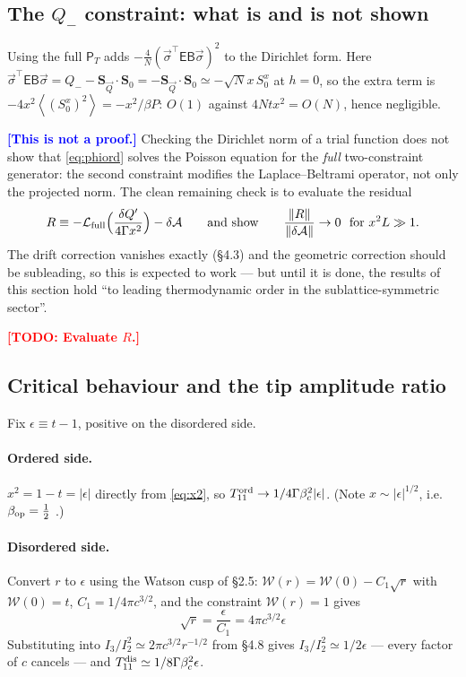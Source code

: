 \documentclass[11pt,a4paper]{article}
\newcommand{\bQ}{\vec Q}
\newcommand{\avg}[1]{\left\langle #1 \right\rangle}
\newcommand{\Wc}{\mathcal{W}}
\newcommand{\TODO}[1]{\textcolor{red}{\textbf{[TODO: #1]}}}
\newcommand{\FLAG}[1]{\textcolor{blue}{\textbf{[#1]}}}
\newcommand{\Ac}{\mathcal{A}}
\newcommand{\Lc}{\mathcal{L}}
\newcommand{\Em}{\mathsf{E}}
\newcommand{\Pt}{\mathsf{P}_{T}}
\newcommand{\Tm}{T}
\newcommand{\bQ}{\vec Q}
\newcommand{\bs}{\vec\sigma}
\newcommand{\avg}[1]{\left\langle #1 \right\rangle}
\newcommand{\Wc}{\mathcal{W}}
\newcommand{\TODO}[1]{\textcolor{red}{\textbf{[TODO: #1]}}}
\newcommand{\FLAG}[1]{\textcolor{blue}{\textbf{[#1]}}}
\begin{document}
\subsection{The $Q_-$ constraint: what is and is not shown}
\label{sec:Qminus}
Using the full $\Pt$ adds $-\tfrac4N(\bs^\top\Em\mathsf B\bs)^2$ to the Dirichlet form.
Here $\bs^\top\Em\mathsf B\bs=Q_--\bm S_{\bQ}\cdot\bm S_0=-\bm S_{\bQ}\cdot\bm S_0\simeq-\sqrt Nx\,S^x_0$
at $h=0$, so the extra term is $-4x^2\avg{(S^x_0)^2}=-x^2/\beta P$: $O(1)$ against
$4Ntx^2=O(N)$, hence negligible.

\FLAG{This is not a proof.} Checking the Dirichlet norm of a trial function does not show
that \eqref{eq:phiord} solves the Poisson equation for the \emph{full} two-constraint
generator: the second constraint modifies the Laplace--Beltrami operator, not only the
projected norm. The clean remaining check is to evaluate the residual
\begin{equation}
  R\equiv-\Lc_{\rm full}\Big(\frac{\delta Q'}{4\Gamma x^{2}}\Big)-\delta\Ac
  \qquad\text{and show}\qquad
  \frac{\|R\|}{\|\delta\Ac\|}\to0\ \text{ for } x^2L\gg1 .
\end{equation}
The drift correction vanishes exactly (\S4.3) and the geometric correction should be
subleading, so this is expected to work --- but until it is done, the results of this
section hold ``to leading thermodynamic order in the sublattice-symmetric sector''.

\TODO{Evaluate $R$.}

\subsection{Critical behaviour and the tip amplitude ratio}
\label{sec:ratio}
Fix $\epsilon\equiv t-1$, positive on the disordered side.

\paragraph{Ordered side.} $x^2=1-t=|\epsilon|$ directly from \eqref{eq:x2}, so
$\Tm_{11}^{\rm ord}\to1/4\Gamma\beta_c^2|\epsilon|$. (Note $x\sim|\epsilon|^{1/2}$, i.e.\
$\beta_{\rm op}=\tfrac12$ \checkmark.)

\paragraph{Disordered side.} Convert $r$ to $\epsilon$ using the Watson cusp of \S2.5:
$\Wc(r)=\Wc(0)-C_1\sqrt r$ with $\Wc(0)=t$, $C_1=1/4\pi c^{3/2}$, and the constraint
$\Wc(r)=1$ gives
\begin{equation}
  \boxed{\ \sqrt r=\frac{\epsilon}{C_1}=4\pi c^{3/2}\epsilon\ }
  \label{eq:reps}
\end{equation}
Substituting into $I_3/I_2^2\simeq2\pi c^{3/2}r^{-1/2}$ from \S4.8 gives
$I_3/I_2^2\simeq1/2\epsilon$ --- every factor of $c$ cancels --- and
$\Tm_{11}^{\rm dis}\simeq1/8\Gamma\beta_c^2\epsilon$.
\end{document}
